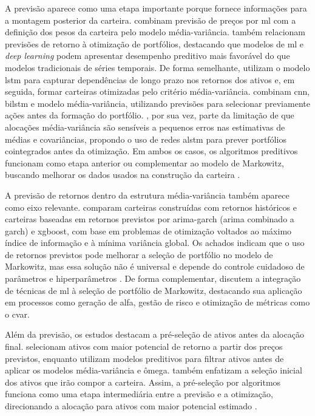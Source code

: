A previsão aparece como uma etapa importante porque fornece informações para a montagem posterior da carteira.  combinam previsão de preços por \acl{ml} com a definição dos pesos da carteira pelo modelo média-variância.  também relacionam previsões de retorno à otimização de portfólios, destacando que modelos de \acl{ml} e \textit{deep learning} podem apresentar desempenho preditivo mais favorável do que modelos tradicionais de séries temporais. De forma semelhante,  utilizam o modelo \ac{lstm} para capturar dependências de longo prazo nos retornos dos ativos e, em seguida, formar carteiras otimizadas pelo critério média-variância.  combinam \acf{cnn}, \acf{bilstm} e modelo média-variância, utilizando previsões para selecionar previamente ações antes da formação do portfólio. , por sua vez, parte da limitação de que alocações média-variância são sensíveis a pequenos erros nas estimativas de médias e covariâncias, propondo o uso de redes \ac{alstm} para prever portfólios cointegrados antes da otimização. Em ambos os casos, os algoritmos preditivos funcionam como etapa anterior ou complementar ao modelo de Markowitz, buscando melhorar os dados usados na construção da carteira \cite{chaweewanchon2022markowitz,du2022mean}.

A previsão de retornos dentro da estrutura média-variância também aparece como eixo relevante.  comparam carteiras construídas com retornos históricos e carteiras baseadas em retornos previstos por \acs{arima}-\acs{garch} (\acl{arima} combinado a \acl{garch}) e \acf{xgboost}, com base em problemas de otimização voltados ao máximo índice de informação e à mínima variância global. Os achados indicam que o uso de retornos previstos pode melhorar a seleção de portfólio no modelo de Markowitz, mas essa solução não é universal e depende do controle cuidadoso de parâmetros e hiperparâmetros \cite{slusarczyk2025optimal}. De forma complementar,  discutem a integração de técnicas de \acl{ml} à seleção de portfólio de Markowitz, destacando sua aplicação em processos como geração de alfa, gestão de risco e otimização de métricas como o \acs{cvar}.

Além da previsão, os estudos destacam a pré-seleção de ativos antes da alocação final.  selecionam ativos com maior potencial de retorno a partir dos preços previstos, enquanto  utilizam modelos preditivos para filtrar ativos antes de aplicar os modelos média-variância e ômega.  também enfatizam a seleção inicial dos ativos que irão compor a carteira. Assim, a pré-seleção por algoritmos funciona como uma etapa intermediária entre a previsão e a otimização, direcionando a alocação para ativos com maior potencial estimado \cite{wang2020portfolio,chen2021mean,ma2021portfolio}. 

